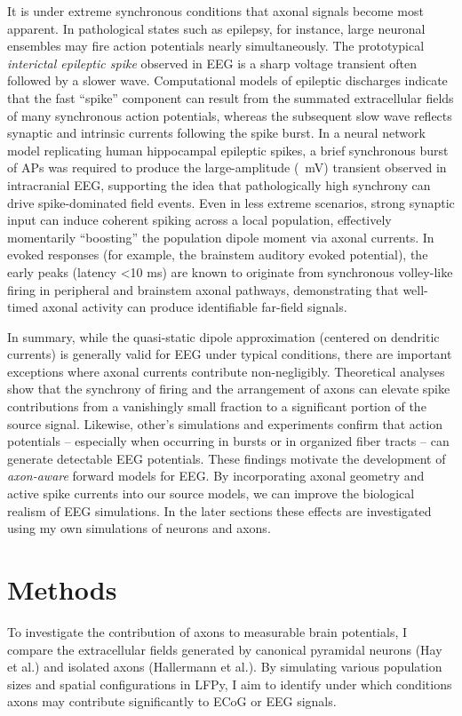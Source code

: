 \documentclass[final, a4paper,masters,en,listoffigures,listoftables,norwegiandates]{NMBU}
\begin{document}
It is under extreme synchronous conditions that axonal signals become most apparent. In pathological states such as epilepsy, for instance, large neuronal ensembles may fire action potentials nearly simultaneously. The prototypical \emph{interictal epileptic spike} observed in EEG is a sharp voltage transient often followed by a slower wave. Computational models of epileptic discharges indicate that the fast “spike” component can result from the summated extracellular fields of many synchronous action potentials, whereas the subsequent slow wave reflects synaptic and intrinsic currents following the spike burst. In a neural network model replicating human hippocampal epileptic spikes, a brief synchronous burst of APs was required to produce the large-amplitude (~mV) transient observed in intracranial EEG, supporting the idea that pathologically high synchrony can drive spike-dominated field events. Even in less extreme scenarios, strong synaptic input can induce coherent spiking across a local population, effectively momentarily “boosting” the population dipole moment via axonal currents. In evoked responses (for example, the brainstem auditory evoked potential), the early peaks (latency <10 ms) are known to originate from synchronous volley-like firing in peripheral and brainstem axonal pathways, demonstrating that well-timed axonal activity can produce identifiable far-field signals.

In summary, while the quasi-static dipole approximation (centered on dendritic currents) is generally valid for EEG under typical conditions, there are important exceptions where axonal currents contribute non-negligibly. Theoretical analyses show that the synchrony of firing and the arrangement of axons can elevate spike contributions from a vanishingly small fraction to a significant portion of the source signal. Likewise, other's simulations and experiments confirm that action potentials – especially when occurring in bursts or in organized fiber tracts – can generate detectable EEG potentials. These findings motivate the development of \emph{axon-aware} forward models for EEG. By incorporating axonal geometry and active spike currents into our source models, we can improve the biological realism of EEG simulations. In the later sections these effects are investigated using my own simulations of neurons and axons.

\clearpage
\section{Methods}
To investigate the contribution of axons to measurable brain potentials, I compare the extracellular fields generated by canonical pyramidal neurons (Hay et al.) and isolated axons (Hallermann et al.). By simulating various population sizes and spatial configurations in LFPy, I aim to identify under which conditions axons may contribute significantly to ECoG or EEG signals.
\end{document}
